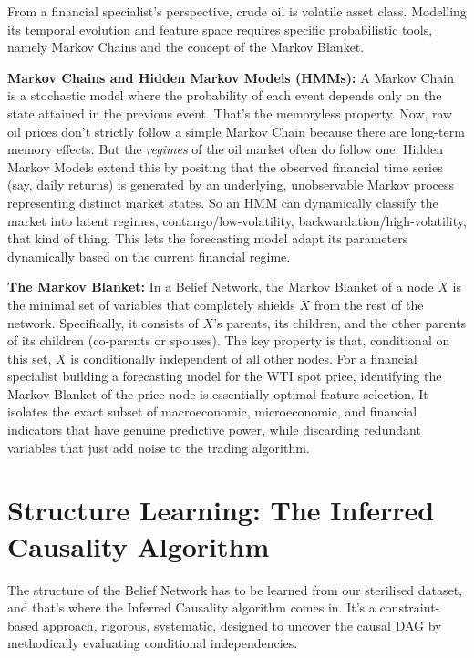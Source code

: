 \documentclass[11pt,a4paper]{article}
\begin{document}
From a financial specialist's perspective, crude oil is volatile asset class. 
Modelling its temporal evolution and feature space requires specific probabilistic 
tools, namely Markov Chains and the concept of the Markov Blanket.

\textbf{Markov Chains and Hidden Markov Models (HMMs):} A Markov Chain is 
a stochastic model where the probability of each event depends only on the 
state attained in the previous event. That's the memoryless property. 
Now, raw oil prices don't strictly follow a simple Markov Chain because 
there are long-term memory effects. But the \textit{regimes} of the oil 
market often do follow one. Hidden Markov Models extend this by positing 
that the observed financial time series (say, daily returns) is generated 
by an underlying, unobservable Markov process representing distinct market 
states. So an HMM can dynamically classify the market into latent regimes, 
contango/low-volatility, backwardation/high-volatility, that kind of thing. 
This lets the forecasting model adapt its parameters dynamically based on 
the current financial regime.

\textbf{The Markov Blanket:} In a Belief Network, the Markov Blanket of 
a node $X$ is the minimal set of variables that completely shields $X$ 
from the rest of the network. Specifically, it consists of $X$'s parents, 
its children, and the other parents of its children (co-parents or spouses). 
The key property is that, conditional on this set, $X$ is conditionally 
independent of all other nodes. For a financial specialist building a 
forecasting model for the WTI spot price, identifying the Markov Blanket 
of the price node is essentially optimal feature selection. It isolates 
the exact subset of macroeconomic, microeconomic, and financial indicators 
that have genuine predictive power, while discarding redundant variables 
that just add noise to the trading algorithm.








\section{Structure Learning: The Inferred Causality Algorithm}

The structure of the Belief Network has to be learned from our sterilised 
dataset, and that's where the Inferred Causality algorithm comes in. 
It's a constraint-based approach, rigorous, systematic, designed to uncover 
the causal DAG by methodically evaluating conditional independencies.
\end{document}
